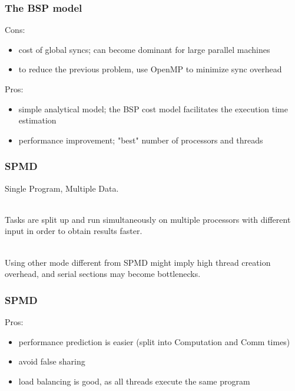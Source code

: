 \documentclass{beamer}
\begin{document}
\begin{frame}
\frametitle{The BSP model}

Cons:

\begin{itemize}
\item cost of global syncs; can become dominant for large parallel machines
\item to reduce the previous problem, use OpenMP to minimize sync overhead
\end{itemize}

Pros:

\begin{itemize}
\item simple analytical model; the BSP cost model facilitates the execution time estimation
\item performance improvement; "best" number of processors and threads
\end{itemize}

\end{frame}


\begin{frame}
\frametitle{SPMD}

Single Program, Multiple Data.

\ \\

Tasks are split up and run simultaneously on multiple processors with different input in order to obtain results faster.

\ \\

Using other mode different from SPMD might imply high thread creation overhead, and serial sections may become bottlenecks. 

\end{frame}

\begin{frame}
\frametitle{SPMD}

Pros:

\begin{itemize}

\item performance prediction is easier (split into Computation and Comm times)
\item avoid false sharing
\item load balancing is good, as all threads execute the same program

\end{itemize}

\end{frame}
\end{document}

